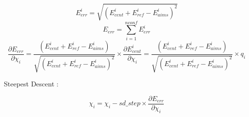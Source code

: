 \documentclass{article}
\begin{document}
	\begin{equation}
	E_{err}^i=\sqrt{(E_{cent}^i+E_{ref}^i-E_{aims}^i)^2}
		\end{equation}
	\begin{equation}
	E_{err}=\sum_{i=1}^{nconf} E_{err}^i
	\end{equation}
	\begin{equation}
	\frac{\partial E_{err}}{\partial \chi_i}=\frac{(E_{cent}^i+E_{ref}^i-E_{aims}^i)}{\sqrt{(E_{cent}^i+E_{ref}^i-E_{aims}^i)^2}}\times{\frac{\partial E_{cent}^i}{\partial \chi_i}} = \frac{(E_{cent}^i+E_{ref}^i-E_{aims}^i)}{\sqrt{(E_{cent}^i+E_{ref}^i-E_{aims}^i)^2}}\times q_i
		\end{equation}

	Steepest Descent :

	\begin{equation}
	\chi_i = \chi_i - sd\_step\times\frac{\partial E_{err}}{\partial \chi_i}
	\end{equation}
\end{document}
